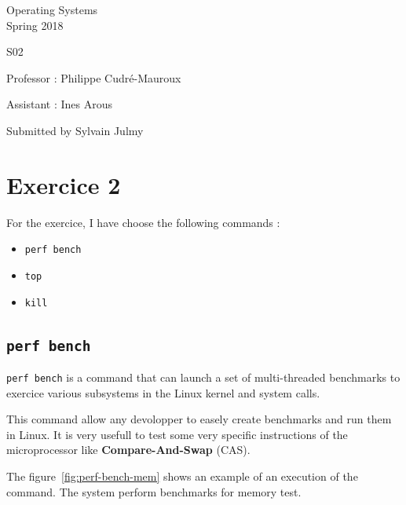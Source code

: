 \documentclass[a4paper,11pt]{report}
\author{Sylvain Julmy}
\date{\today}
\begin{document}
\begin{center}
  \Large{
    Operating Systems\\
    Spring 2018
  }
  
  \noindent\makebox[\linewidth]{\rule{\linewidth}{0.4pt}}
  S02
  \noindent\makebox[\linewidth]{\rule{\linewidth}{0.4pt}}

  \begin{flushleft}
    Professor : Philippe Cudré-Mauroux

    Assistant : Ines Arous
  \end{flushleft}
  
  \noindent\makebox[\linewidth]{\rule{\linewidth}{0.4pt}}

  Submitted by Sylvain Julmy
  
  \noindent\makebox[\linewidth]{\rule{\textwidth}{1pt}}
\end{center}

\section*{Exercice 2}

For the exercice, I have choose the following commands :
\begin{itemize}
\item \verb+perf bench+
\item \verb+top+
\item \verb+kill+
\end{itemize}

\subsection*{\texttt{perf bench}}

\verb+perf bench+ is a command that can launch a set of multi-threaded
benchmarks to exercice various subsystems in the Linux kernel and system calls.

This command allow any devolopper to easely create benchmarks and run them in
Linux. It is very usefull to test some very specific instructions of the
microprocessor like \textbf{Compare-And-Swap} (CAS).

The figure~\ref{fig:perf-bench-mem} shows an example of an execution of the
command. The system perform benchmarks for memory test.
\end{document}
